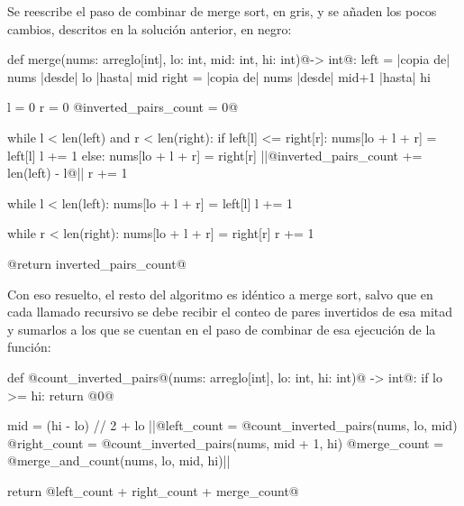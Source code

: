 Se reescribe el paso de combinar de merge sort, en gris, y se añaden los pocos cambios, descritos en la solución anterior, en negro:
\begin{codeblock}
\begin{pseudocode}[style=derived]
def merge(nums: arreglo[int], lo: int, mid: int, hi: int)@-> int@:
    left = |\textrm{copia de}| nums |\textrm{desde}| lo |\textrm{hasta}| mid
    right = |\textrm{copia de}| nums |\textrm{desde}| mid+1 |\textrm{hasta}| hi

    l = 0
    r = 0
    @inverted_pairs_count = 0@

    while l < len(left) and r < len(right):
        if left[l] <= right[r]:
            nums[lo + l + r] = left[l]
            l += 1
        else:
            nums[lo + l + r] = right[r]
            ||@inverted_pairs_count += len(left) - l@||
            r += 1

    while l < len(left):
        nums[lo + l + r] = left[l]
        l += 1

    while r < len(right):
        nums[lo + l + r] = right[r]
        r += 1

    @return inverted_pairs_count@
\end{pseudocode}
\begin{annotations}
\end{annotations}
\end{codeblock}

Con eso resuelto, el resto del algoritmo es idéntico a merge sort, salvo que en cada llamado recursivo se debe recibir el conteo de pares invertidos de esa mitad y sumarlos a los que se cuentan en el paso de combinar de esa ejecución de la función:
\begin{codeblock}
\begin{pseudocode}[style=derived]
def @count_inverted_pairs@(nums: arreglo[int], lo: int, hi: int)@ -> int@:
    if lo >= hi: return @0@

    mid = (hi - lo) // 2 + lo
    ||@left_count = @count_inverted_pairs(nums, lo, mid)
    @right_count = @count_inverted_pairs(nums, mid + 1, hi)
    @merge_count = @merge_and_count(nums, lo, mid, hi)||

    return @left_count + right_count + merge_count@
\end{pseudocode}
\begin{annotations}
\end{annotations}
\end{codeblock}

